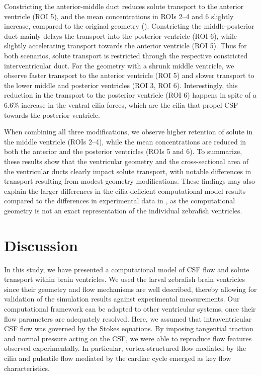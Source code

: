\documentclass{WileyMSP-template}
\begin{document}
Constricting the anterior-middle duct
reduces solute transport to the anterior ventricle (ROI 5), and the
mean concentrations in ROIs 2--4 and 6 slightly increase, compared to
the original geometry ().
Constricting the middle-posterior duct
mainly delays the transport into the posterior ventricle (ROI 6),
while slightly accelerating transport towards the anterior
ventricle (ROI 5). 
Thus for both scenarios, solute transport is restricted through
the respective constricted interventricular duct.
For the geometry with a shrunk middle
ventricle, we observe faster transport
to the anterior ventricle (ROI 5)
and slower transport to the lower middle 
and posterior ventricles (ROI 3, ROI 6). 
Interestingly, this reduction in the transport to the
posterior ventricle (ROI 6) happens in spite of a 6.6\% increase in
the ventral cilia forces, which are the cilia that propel
CSF towards the posterior ventricle.

When combining all three modifications,
we observe higher retention of solute in the middle ventricle (ROIs 2--4),
while the mean concentrations are reduced in both the anterior
and the posterior ventricles (ROIs 5 and 6).
To summarize, these results show that the ventricular geometry and the
cross-sectional area of the ventricular ducts clearly impact solute
transport, with notable differences in transport resulting from modest
geometry modifications. These findings may also explain the larger
differences in the cilia-deficient computational model results
compared to the differences in experimental data in ,
as the computational geometry is not an exact representation of the
individual zebrafish ventricles.

\section{Discussion}
In this study, we have presented a computational model of CSF flow and
solute transport within brain ventricles.  We used the larval
zebrafish brain ventricles since their geometry and flow mechanisms are
well described, thereby allowing for validation of the simulation
results against experimental measurements. Our computational framework
can be adapted to other ventricular systems, once their flow parameters
are adequately resolved. Here, we assumed that
intraventricular CSF flow was governed by the Stokes equations. By
imposing tangential traction and normal pressure acting on the CSF, we
were able to reproduce flow features observed experimentally. In
particular, vortex-structured flow mediated by the cilia and pulsatile
flow mediated by the cardiac cycle emerged as key flow characteristics.
\end{document}
